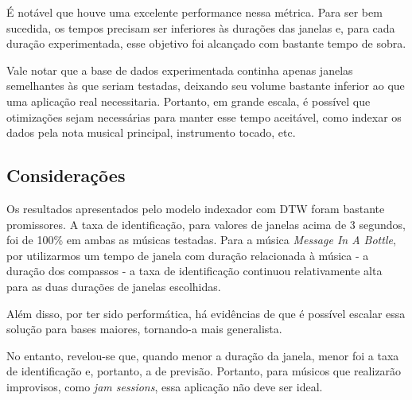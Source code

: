 É notável que houve uma excelente performance nessa métrica. Para ser bem sucedida, os tempos precisam ser inferiores às durações das janelas e, para cada duração experimentada, esse objetivo foi alcançado com bastante tempo de sobra.

Vale notar que a base de dados experimentada continha apenas janelas semelhantes às que seriam testadas, deixando seu volume bastante inferior ao que uma aplicação real necessitaria. Portanto, em grande escala, é possível que otimizações sejam necessárias para manter esse tempo aceitável, como indexar os dados pela nota musical principal, instrumento tocado, etc.

\subsection{Considerações}

Os resultados apresentados pelo modelo indexador com DTW foram bastante promissores. A taxa de identificação, para valores de janelas acima de 3 segundos, foi de 100\% em ambas as músicas testadas. Para a música \textit{Message In A Bottle}, por utilizarmos um tempo de janela com duração relacionada à música - a duração dos compassos - a taxa de identificação continuou relativamente alta para as duas durações de janelas escolhidas.

Além disso, por ter sido performática, há evidências de que é possível escalar essa solução para bases maiores, tornando-a mais generalista.

No entanto, revelou-se que, quando menor a duração da janela, menor foi a taxa de identificação e, portanto, a de previsão. Portanto, para músicos que realizarão improvisos, como \textit{jam sessions}, essa aplicação não deve ser ideal.